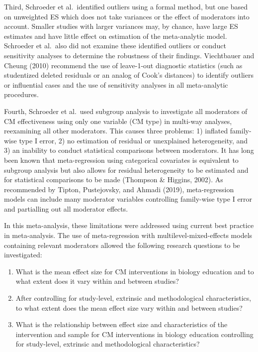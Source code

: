 \documentclass[
  letterpaper,
  DIV=11,
  numbers=noendperiod]{scrartcl}
\begin{document}
Third, Schroeder et al.~identified outliers using a formal method, but
one based on unweighted ES which does not take variances or the effect
of moderators into account. Smaller studies with larger variances may,
by chance, have large ES estimates and have little effect on estimation
of the meta-analytic model. Schroeder et al.~also did not examine these
identified outliers or conduct sensitivity analyses to determine the
robustness of their findings. Viechtbauer and Cheung (2010) recommend
the use of leave-1-out diagnostic statistics (such as studentized
deleted residuals or an analog of Cook's distances) to identify outliers
or influential cases and the use of sensitivity analyses in all
meta-analytic procedures.

Fourth, Schroeder et al.~used subgroup analysis to investigate all
moderators of CM effectiveness using only one variable (CM type) in
multi-way analyses, reexamining all other moderators. This causes three
problems: 1) inflated family-wise type I error, 2) no estimation of
residual or unexplained heterogeneity, and 3) an inability to conduct
statistical comparisons between moderators. It has long been known that
meta-regression using categorical covariates is equivalent to subgroup
analysis but also allows for residual heterogeneity to be estimated and
for statistical comparisons to be made (Thompson \& Higgins, 2002). As
recommended by Tipton, Pustejovsky, and Ahmadi (2019), meta-regression
models can include many moderator variables controlling family-wise type
I error and partialling out all moderator effects.

In this meta-analysis, these limitations were addressed using current
best practice in meta-analysis. The use of meta-regression with
multilevel-mixed-effects models containing relevant moderators allowed
the following research questions to be investigated:

\begin{enumerate}[{RQ}1.]
\item What is the mean effect size for CM interventions in biology education and to what extent does it vary within and between studies?
\item After controlling for study-level, extrinsic and methodological characteristics, to what extent does the mean effect size vary within and between studies?
\item What is the relationship between effect size and characteristics of the intervention and sample for CM interventions in biology education controlling for study-level, extrinsic and methodological characteristics?
\end{enumerate}
\end{document}
